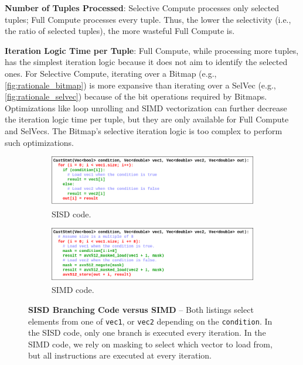 \documentclass[12pt]{cmuthesis}
\begin{document}
\textbf{Number of Tuples Processed}: Selective Compute processes only selected tuples; Full Compute processes every tuple. Thus, the lower the selectivity (i.e., the ratio of selected tuples), the more wasteful Full Compute is.

\textbf{Iteration Logic Time per Tuple}: Full Compute, while processing more tuples, has the simplest iteration logic because it does not aim to identify the selected ones. For Selective Compute, iterating over a Bitmap (e.g., \cref{fig:rationale_bitmap}) is more expansive than iterating over a SelVec (e.g., \cref{fig:rationale_selvec}) because of the bit operations required by Bitmaps. Optimizations like loop unrolling and SIMD vectorization can further decrease the iteration logic time per tuple, but they are only available for Full Compute and SelVecs. The Bitmap's selective iteration logic is too complex to perform such optimizations.


\begin{figure}[t!]
\centering
\hspace*{\fill}%
\begin{subfigure}[t]{.8\linewidth}
 \centering
 \includegraphics[width=0.9\linewidth]{images/BranchingCodeSISD.png}
 \caption{SISD code.}
  \label{fig:branching_sisd}
\end{subfigure}%
\hspace*{\fill}%
\vspace*{8pt}%

\hspace*{\fill}%

\begin{subfigure}[t]{.8\linewidth}
 \centering
 \includegraphics[width=0.9\linewidth]{images/BranchingCodeSIMD.png}
 \caption{SIMD code.}
  \label{fig:branching_simd}
\end{subfigure}
\caption{\textbf{SISD Branching Code versus SIMD} -- Both listings select elements from one of \texttt{vec1}, or \texttt{vec2} depending on the \texttt{condition}. In the SISD code, only one branch is executed every iteration. In the SIMD code, we rely on masking to select which vector to load from, but all instructions are executed at every iteration.}
\label{fig:branching_code}
\end{figure}
\end{document}
